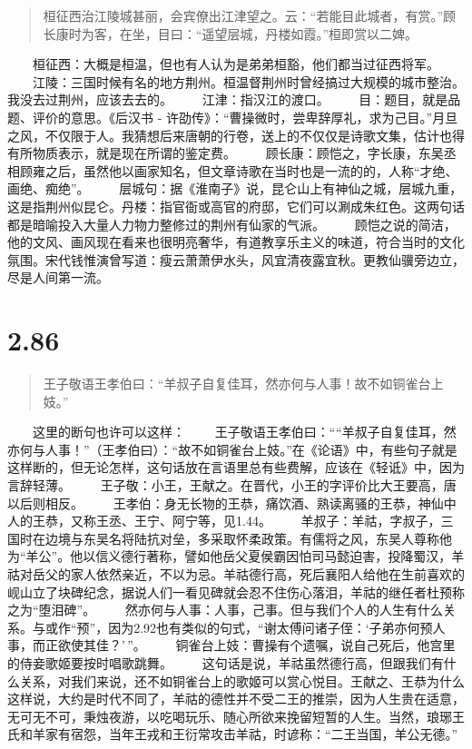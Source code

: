 \documentclass[]{book}
\begin{document}
\begin{quote}
桓征西治江陵城甚丽，会宾僚出江津望之。云：``若能目此城者，有赏。''顾长康时为客，在坐，目曰：``遥望层城，丹楼如霞。''桓即赏以二婢。
\end{quote}

　　桓征西：大概是桓温，但也有人认为是弟弟桓豁，他们都当过征西将军。
　　江陵：三国时候有名的地方荆州。桓温督荆州时曾经搞过大规模的城市整治。我没去过荆州，应该去去的。
　　江津：指汉江的渡口。 　　目：题目，就是品题、评价的意思。《后汉书 -
许劭传》：``曹操微时，尝卑辞厚礼，求为己目。''月旦之风，不仅限于人。我猜想后来唐朝的行卷，送上的不仅仅是诗歌文集，估计也得有所物质表示，就是现在所谓的鉴定费。
　　顾长康：顾恺之，字长康，东吴丞相顾雍之后，虽然他以画家知名，但文章诗歌在当时也是一流的的，人称``才绝、画绝、痴绝''。
　　层城句：据《淮南子》说，昆仑山上有神仙之城，层城九重，这是指荆州似昆仑。丹楼：指官衙或高官的府邸，它们可以涮成朱红色。这两句话都是暗喻投入大量人力物力整修过的荆州有仙家的气派。
　　顾恺之说的简洁，他的文风、画风现在看来也很明亮奢华，有道教享乐主义的味道，符合当时的文化氛围。宋代钱惟演曾写道：瘦云萧萧伊水头，风宜清夜露宜秋。更教仙骥旁边立，尽是人间第一流。

\section{2.86}\label{section-132}

\begin{quote}
王子敬语王孝伯曰：``羊叔子自复佳耳，然亦何与人事！故不如铜雀台上妓。''
\end{quote}

　　这里的断句也许可以这样：
　　王子敬语王孝伯曰：````羊叔子自复佳耳，然亦何与人事！''（王孝伯曰）：``故不如铜雀台上妓。''在《论语》中，有些句子就是这样断的，但无论怎样，这句话放在言语里总有些费解，应该在《轻诋》中，因为言辞轻薄。
　　王子敬：小王，王献之。在晋代，小王的字评价比大王要高，唐以后则相反。
　　王孝伯：身无长物的王恭，痛饮酒、熟读离骚的王恭，神仙中人的王恭，又称王丞、王宁、阿宁等，见1.44。
　　羊叔子：羊祜，字叔子，三国时在边境与东吴名将陆抗对垒，多采取怀柔政策。有儒将之风，东吴人尊称他为``羊公''。他以信义德行著称，譬如他岳父夏侯霸因怕司马懿迫害，投降蜀汉，羊祜对岳父的家人依然亲近，不以为忌。羊祜德行高，死后襄阳人给他在生前喜欢的岘山立了块碑纪念，据说人们一看见碑就会忍不住伤心落泪，羊祜的继任者杜预称之为``堕泪碑''。
　　然亦何与人事：人事，己事。但与我们个人的人生有什么关系。与或作``预''，因为2.92也有类似的句式，``谢太傅问诸子侄：`子弟亦何预人事，而正欲使其佳？'\,''。
　　铜雀台上妓：曹操有个遗嘱，说自己死后，他宫里的侍妾歌姬要按时唱歌跳舞。
　　这句话是说，羊祜虽然德行高，但跟我们有什么关系，对我们来说，还不如铜雀台上的歌姬可以赏心悦目。王献之、王恭为什么这样说，大约是时代不同了，羊祜的德性并不受二王的推崇，因为人生贵在适意，无可无不可，秉烛夜游，以吃喝玩乐、随心所欲来挽留短暂的人生。当然，琅琊王氏和羊家有宿怨，当年王戎和王衍常攻击羊祜，时谚称：``二王当国，羊公无德。''　　　　　　
\end{document}
